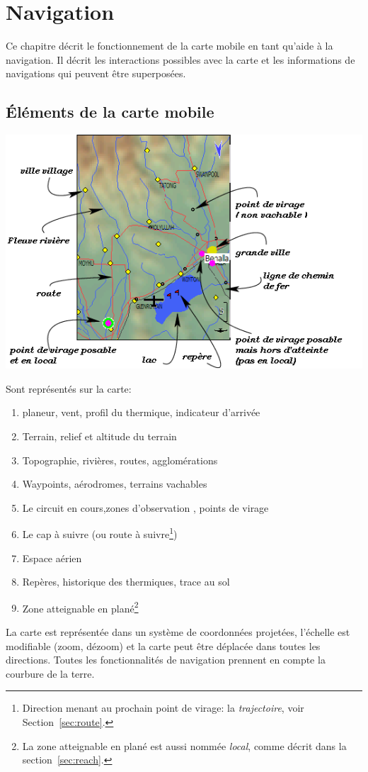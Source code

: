 \chapter{Navigation}\label{cha:navigation}
Ce chapitre décrit le fonctionnement de la carte mobile en tant qu'aide à la navigation.
Il décrit  les interactions possibles avec la carte et les informations de navigations qui peuvent être superposées.

\section{Éléments de la carte mobile}

\begin{maxipage}
\includegraphics[angle=0,width=0.9\linewidth,keepaspectratio='true']{figures/fig-map.png}
\end{maxipage}

Sont représentés sur la carte:
\begin{enumerate} 
\item planeur, vent, profil du thermique, indicateur d'arrivée
\item Terrain, relief et altitude du terrain
\item Topographie, rivières, routes, agglomérations
\item Waypoints, aérodromes, terrains vachables 
\item Le circuit en cours,zones d'observation , points de virage
\item Le cap à suivre (ou route à suivre\footnote{Direction menant au prochain point de virage: la  {\em trajectoire}, voir Section~\ref{sec:route}.}) 
\item Espace aérien
\item Repères, historique des thermiques, trace au sol
\item Zone atteignable en plané\footnote{La zone atteignable en plané est aussi nommée {\em local}, comme décrit dans la  section~\ref{sec:reach}.}
\end{enumerate}
La carte est représentée dans un système de coordonnées projetées, l'échelle est modifiable (zoom, dézoom) et la carte peut être déplacée dans toutes les directions. Toutes les fonctionnalités de navigation prennent en compte la courbure de la terre.

